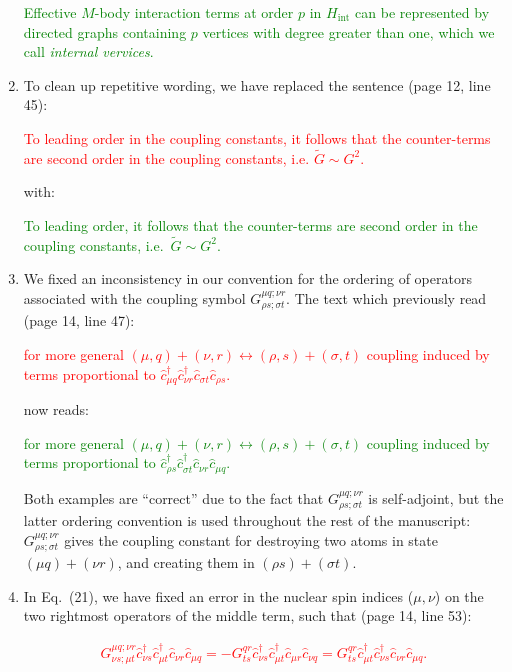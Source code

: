 \documentclass[preprint,showkeys,nofootinbib]{revtex4-1}
\renewcommand{\t}{\text} %
\newcommand{\p}[1]{\left(#1\right)} %
\renewcommand{\c}{\hat{c}}
\newcommand{\1}{\mathds{1}}
\newcommand{\red}[1]{\textcolor{red}{#1}}
\newcommand{\green}[1]{\textcolor{green}{#1}}
\begin{document}
\begin{enumerate}[label=(R3.\arabic*)]
  \green{Effective $M$-body interaction terms at order $p$ in
    $H_{\t{int}}$ can be represented by directed graphs containing $p$
    vertices with degree greater than one, which we call {\it internal
      vervices}.}


\item To clean up repetitive wording, we have replaced the sentence
  (page 12, line 45):

  \red{To leading order in the coupling constants, it follows that the
    counter-terms are second order in the coupling constants,
    i.e. $\tilde G\sim G^2$.}

  with:

  \green{To leading order, it follows that the counter-terms are
    second order in the coupling constants, i.e.~$\tilde G\sim G^2$.}


\item We fixed an inconsistency in our convention for the ordering of
  operators associated with the coupling symbol
  $G^{\mu q;\nu r}_{\rho s;\sigma t}$.  The text which previously read
  (page 14, line 47):

  \red{for more general
    $\p{\mu,q}+\p{\nu,r}\leftrightarrow\p{\rho,s}+\p{\sigma,t}$
    coupling induced by terms proportional to
    $\c_{\mu q}^\dag \c_{\nu r}^\dag \c_{\sigma t} \c_{\rho s}$.}

  now reads:

  \green{for more general
    $\p{\mu,q}+\p{\nu,r}\leftrightarrow\p{\rho,s}+\p{\sigma,t}$
    coupling induced by terms proportional to
    $\c_{\rho s}^\dag \c_{\sigma t}^\dag \c_{\nu r} \c_{\mu q}$.}

  Both examples are ``correct'' due to the fact that
  $G^{\mu q;\nu r}_{\rho s;\sigma t}$ is self-adjoint, but the latter
  ordering convention is used throughout the rest of the manuscript:
  $G^{\mu q;\nu r}_{\rho s;\sigma t}$ gives the coupling constant for
  destroying two atoms in state $\p{\mu q}+\p{\nu r}$, and creating
  them in $\p{\rho s}+\p{\sigma t}$.


\item In Eq.~(21), we have fixed an error in the nuclear spin indices
  ($\mu,\nu$) on the two rightmost operators of the middle term, such
  that (page 14, line 53):

  \red{\begin{align*}
      G^{\mu q;\nu r}_{\nu s;\mu t}
      \c_{\nu s}^\dag \c_{\mu t}^\dag \c_{\nu r} \c_{\mu q}
      = -G^{qr}_{ts} \c_{\nu s}^\dag \c_{\mu t}^\dag \c_{\mu r} \c_{\nu q}
      = G^{qr}_{ts} \c_{\mu t}^\dag \c_{\nu s}^\dag \c_{\nu r} \c_{\mu q}.
      \tag{21}
    \end{align*}}


\end{enumerate}
\end{document}
